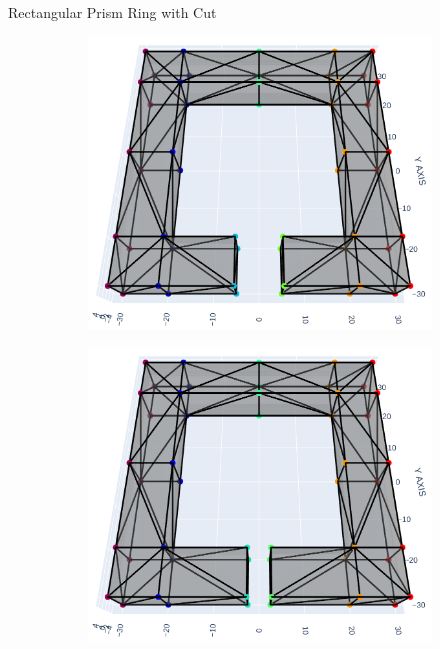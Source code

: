 \documentclass[xcolor=dvipsnames, aspectratio=169]{beamer}
\begin{document}
\begin{frame}{Rectangular Prism Ring with Cut}
\begin{figure}
\begin{subfigure}[b]{0.15\textwidth}
\includegraphics[width=\linewidth]{Final Run, (rect prism ring 10 mm cut) meshpy plotly screenshot.png}
\end{subfigure}
\begin{subfigure}[b]{0.15\textwidth}
\includegraphics[width=\linewidth]{Final Run, (rect prism ring 05 mm cut) meshpy plotly screenshot.png}
\end{subfigure}
\begin{subfigure}[b]{0.15\textwidth}

\end{subfigure}
\end{figure}
\end{frame}
\end{document}
